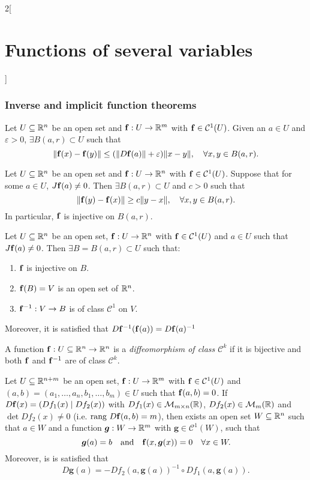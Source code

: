 \documentclass[../../../main.tex]{subfiles}
\begin{document}
\begin{multicols}{2}[\section{Functions of several variables}]
    \subsubsection*{Inverse and implicit function theorems}
    \begin{lemma}
        Let $U\subseteq\mathbb{R}^n$ be an open set and $\vb{f}:U\rightarrow\mathbb{R}^m$ with $\vb{f}\in \mathcal{C}^1(U)$. Given an $a\in U$ and $\varepsilon>0$, $\exists B(a,r)\subset U$ such that $$\|\vb{f}(x)-\vb{f}(y)\|\leq(\|D\vb{f}(a)\|+\varepsilon)\|x-y\|,\quad\forall x,y\in B(a,r).$$
    \end{lemma}
    \begin{lemma}
        Let $U\subseteq\mathbb{R}^n$ be an open set and $\vb{f}:U\rightarrow\mathbb{R}^n$ with $\vb{f}\in \mathcal{C}^1(U)$. Suppose that for some $a\in U$, $J\vb{f}(a)\ne 0$. Then $\exists B(a,r)\subset U$ and $c>0$ such that $$\|\vb{f}(y)-\vb{f}(x)\|\geq c\|y-x\|,\quad\forall x,y\in B(a,r).$$ In particular, $\vb{f}$ is injective on $B(a,r)$.
    \end{lemma}
    \begin{theorem}
        Let $U\subseteq\mathbb{R}^n$ be an open set, $\vb{f}:U\rightarrow\mathbb{R}^n$ with $\vb{f}\in \mathcal{C}^1(U)$ and $a\in U$ such that $J\vb{f}(a)\ne0$. Then $\exists B=B(a,r)\subset U$ such that:
        \begin{enumerate}
            \item $\vb{f}$ is injective on $B$.
            \item $\vb{f}(B)=V$ is an open set of $\mathbb{R}^n$.
            \item $\vb{f}^{-1}:V\rightarrow B$ is of class $\mathcal{C}^1$ on $V$.
        \end{enumerate} Moreover, it is satisfied that $D\vb{f}^{-1}(\vb{f}(a))=D\vb{f}(a)^{-1}$
    \end{theorem}
    \begin{definition}
        A function $\vb{f}:U\subseteq\mathbb{R}^n\rightarrow\mathbb{R}^n$ is a \textit{diffeomorphism of class $\mathcal{C}^k$} if it is bijective and both $\vb{f}$ and $\vb{f}^{-1}$ are of class $\mathcal{C}^k$.
    \end{definition}
    \begin{theorem}
        Let $U\subseteq\mathbb{R}^{n+m}$ be an open set, $\vb{f}:U\rightarrow\mathbb{R}^m$ with $\vb{f}\in \mathcal{C}^1(U)$ and $(a,b)=(a_1,\ldots,a_n,b_1,\ldots,b_m)\in U$ such that $\vb{f}(a,b)=0$. If $D\vb{f}(x)=(Df_1(x)\;|\;Df_2(x))$ with $Df_1(x)\in\mathcal{M}_{m\times n}(\mathbb{R} )$, $Df_2(x)\in\mathcal{M}_m(\mathbb{R} )$ and $\det Df_2(x)\ne 0$ (i.e. $\text{rang }D\vb{f}(a,b)=m$), then exists an open set $W\subseteq\mathbb{R}^n$ such that $a\in W$ and a function $\boldsymbol{g}:W\rightarrow\mathbb{R}^m$ with $\boldsymbol{g}\in\mathcal{C}^1(W)$, such that $$\boldsymbol{g}(a)=b\quad\text{and}\quad \vb{f}(x,\boldsymbol{g}(x))=0\quad\forall x\in W.$$ Moreover, is is satisfied that $$D\boldsymbol{g}(a)=-Df_2(a,\boldsymbol{g}(a))^{-1}\circ Df_1(a,\boldsymbol{g}(a)).$$

\end{theorem}
\end{multicols}
\end{document}
